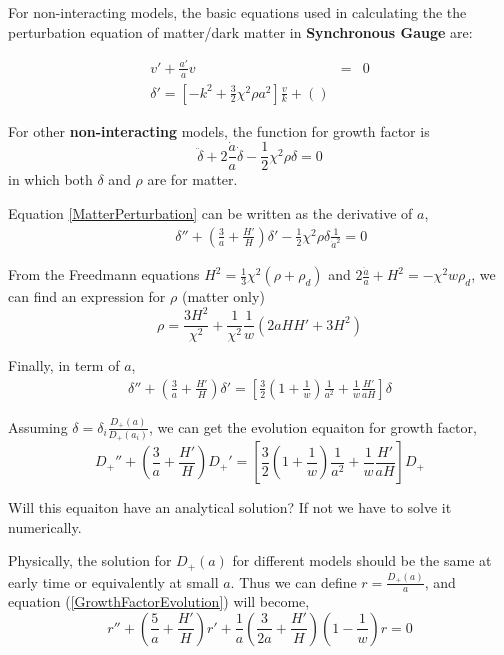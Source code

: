 \documentclass{article}
\begin{document}
{\color{blue}

For non-interacting models, the basic equations used in calculating the the perturbation equation of matter/dark matter in {\bf Synchronous Gauge} are:

\begin{eqnarray}
v' + \frac{a'}{a}v &=& 0 \\
\delta' = [-k^2 + \frac 3 2 \chi^2\rho a^2]\frac{v}{k} + ()
\end{eqnarray}


For other {\bf non-interacting} models, the function for growth factor is
\begin{equation}
\ddot\delta+2\frac{\dot a}{a}\dot\delta-\frac1 2\chi^2\rho \delta=0 \label{MatterPerturbation}
\end{equation}
in which both $\delta$ and $\rho$ are for matter.

Equation \ref{MatterPerturbation} can be written as the derivative of $a$,
\begin{eqnarray}
&& \delta''+(\frac 3 a + \frac {H'}{H})\delta'-\frac 12 \chi^2 \rho\delta\frac{1}{{\dot a}^2}=0
\end{eqnarray}

From the Freedmann equations $H^2=\frac{1}{3}\chi^2(\rho+\rho_d)$ and $2\frac{\ddot a}{a}+H^2=-\chi^2 w\rho_d$, we can find an expression for $\rho$ (matter only)
\begin{equation}
\rho=\frac{3H^2}{\chi^2}+\frac{1}{\chi^2} \frac{1}{w} (2a H H'+3H^2)
\end{equation}

Finally, in term of $a$,
\begin{eqnarray}
\delta''+(\frac{3}{a}+\frac{H'}{H})\delta'=[\frac{3}{2}(1+\frac{1}{w})\frac{1}{a^2}+\frac{1}{w}\frac{H'}{aH}]\delta
\end{eqnarray}

Assuming $\delta=\delta_i \frac{D_+(a)}{D_+(a_i)}$, we can get the evolution equaiton for growth factor,
\begin{equation}
D_+''+(\frac{3}{a}+\frac{H'}{H})D_+'=[\frac{3}{2}(1+\frac{1}{w})\frac{1}{a^2}+\frac{1}{w}\frac{H'}{aH}]D_+   \label{GrowthFactorEvolution}
\end{equation}

Will this equaiton have an analytical solution? If not we have to solve it numerically.

Physically, the solution for $D_+(a)$ for different models should be the same at early time or equivalently at small $a$. Thus we can define $r=\frac{D_+(a)}{a}$, and equation (\ref{GrowthFactorEvolution}) will become,
\begin{equation}
r''+(\frac{5}{a}+\frac{H'}{H})r'+\frac{1}{a}(\frac{3}{2a}+\frac{H'}{H})(1-\frac{1}{w})r=0
\end{equation}

}
\end{document}
